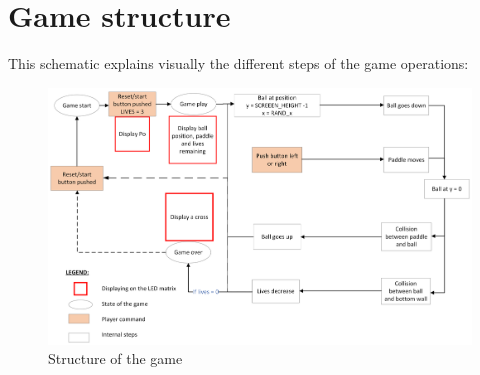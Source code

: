\section{Game structure}

This schematic explains visually the different steps of the game operations:

\begin{figure}[H]
    \centering
    \includegraphics[scale = 0.25]{Ressources/png/Dessin.png}
    \caption{Structure of the game}
    \label{fig_3}
\end{figure}